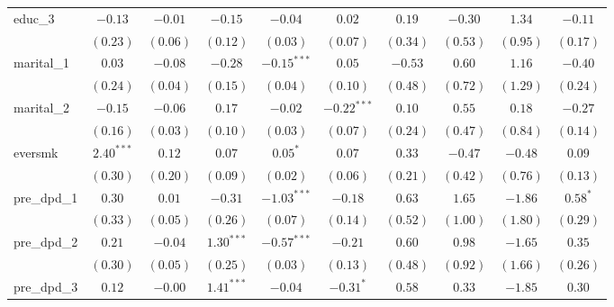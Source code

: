 \begin{tabular}{l c c c c c c c c c}
educ\_3          & $-0.13$       & $-0.01$       & $-0.15$       & $-0.04$       & $0.02$        & $0.19$         & $-0.30$       & $1.34$        & $-0.11$        \\
                 & $(0.23)$      & $(0.06)$      & $(0.12)$      & $(0.03)$      & $(0.07)$      & $(0.34)$       & $(0.53)$      & $(0.95)$      & $(0.17)$       \\
marital\_1       & $0.03$        & $-0.08$       & $-0.28$       & $-0.15^{***}$ & $0.05$        & $-0.53$        & $0.60$        & $1.16$        & $-0.40$        \\
                 & $(0.24)$      & $(0.04)$      & $(0.15)$      & $(0.04)$      & $(0.10)$      & $(0.48)$       & $(0.72)$      & $(1.29)$      & $(0.24)$       \\
marital\_2       & $-0.15$       & $-0.06$       & $0.17$        & $-0.02$       & $-0.22^{***}$ & $0.10$         & $0.55$        & $0.18$        & $-0.27$        \\
                 & $(0.16)$      & $(0.03)$      & $(0.10)$      & $(0.03)$      & $(0.07)$      & $(0.24)$       & $(0.47)$      & $(0.84)$      & $(0.14)$       \\
eversmk          & $2.40^{***}$  & $0.12$        & $0.07$        & $0.05^{*}$    & $0.07$        & $0.33$         & $-0.47$       & $-0.48$       & $0.09$         \\
                 & $(0.30)$      & $(0.20)$      & $(0.09)$      & $(0.02)$      & $(0.06)$      & $(0.21)$       & $(0.42)$      & $(0.76)$      & $(0.13)$       \\
pre\_dpd\_1      & $0.30$        & $0.01$        & $-0.31$       & $-1.03^{***}$ & $-0.18$       & $0.63$         & $1.65$        & $-1.86$       & $0.58^{*}$     \\
                 & $(0.33)$      & $(0.05)$      & $(0.26)$      & $(0.07)$      & $(0.14)$      & $(0.52)$       & $(1.00)$      & $(1.80)$      & $(0.29)$       \\
pre\_dpd\_2      & $0.21$        & $-0.04$       & $1.30^{***}$  & $-0.57^{***}$ & $-0.21$       & $0.60$         & $0.98$        & $-1.65$       & $0.35$         \\
                 & $(0.30)$      & $(0.05)$      & $(0.25)$      & $(0.03)$      & $(0.13)$      & $(0.48)$       & $(0.92)$      & $(1.66)$      & $(0.26)$       \\
pre\_dpd\_3      & $0.12$        & $-0.00$       & $1.41^{***}$  & $-0.04$       & $-0.31^{*}$   & $0.58$         & $0.33$        & $-1.85$       & $0.30$         \\

\end{tabular}
